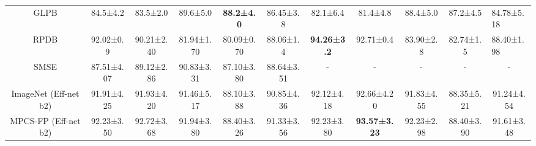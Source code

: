 \documentclass[conference]{IEEEtran}
\begin{document}
\begin{table*}[ht]
\begin{adjustbox}{max width=\textwidth}
\begin{tabular}{c|cccc|c|cccc|c}
GLPB\cite{ataky2020data}                   & \multicolumn{1}{c|}{84.5±4.2}            & \multicolumn{1}{c|}{83.5±2.0}                                    & \multicolumn{1}{c|}{89.6±5.0}                                   & \textbf{88.2±4.0}                          & 86.45±3.8              & \multicolumn{1}{c|}{82.1±6.4}            & \multicolumn{1}{c|}{81.4±4.8}            & \multicolumn{1}{c|}{88.4±5.0}            & 87.2±4.5            & \multicolumn{1}{l}{{\color[HTML]{444444} 84.78±5.18}} \\
RPDB\cite{man2020classification}  & \multicolumn{1}{c|}{92.02±0.9}           & \multicolumn{1}{c|}{90.21±2.40}                                  & \multicolumn{1}{c|}{81.94±1.70}                                 & 80.09±0.70                                 & 88.06±1.4              & \multicolumn{1}{c|}{\textbf{94.26±3.2}}  & \multicolumn{1}{c|}{92.71±0.4}           & \multicolumn{1}{c|}{83.90±2.8}           & 82.74±1.5           & \multicolumn{1}{l}{{\color[HTML]{444444} 88.40±1.98}} \\
SMSE\cite{sun2021magnificationindependent} & \multicolumn{1}{c|}{87.51±4.07}          & \multicolumn{1}{c|}{89.12±2.86}                                  & \multicolumn{1}{c|}{90.83±3.31}                                 & 87.10±3.80                                 & 88.64±3.51             & \multicolumn{1}{c|}{-}                   & \multicolumn{1}{c|}{-}                   & \multicolumn{1}{c|}{-}                   & -                   & -                                                     \\ \hline
ImageNet (Eff-net b2)                                       & \multicolumn{1}{c|}{91.91±4.25}          & \multicolumn{1}{c|}{91.93±4.20}                                  & \multicolumn{1}{c|}{91.46±5.17}                                 & 88.10±3.88                                 & 90.85±4.36             & \multicolumn{1}{c|}{92.12±4.18}          & \multicolumn{1}{c|}{92.66±4.20}          & \multicolumn{1}{c|}{91.83±4.55}          & 88.35±5.21          & 91.24±4.54                                            \\
MPCS-FP (Eff-net b2)                                        & \multicolumn{1}{c|}{92.23±3.50}          & \multicolumn{1}{c|}{92.72±3.68}                                  & \multicolumn{1}{c|}{91.94±3.80}                                 & 88.40±3.26                                 & 91.33±3.56             & \multicolumn{1}{c|}{92.23±3.80}          & \multicolumn{1}{c|}{\textbf{93.57±3.23}} & \multicolumn{1}{c|}{92.23±2.98}          & 88.40±3.90          & 91.61±3.48                                            \\

\end{tabular}
\end{adjustbox}
\end{table*}
\end{document}
